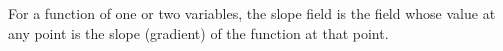 For a function of one or two variables, the slope field is the field
whose value at any point is the slope (gradient) of the function at that point.
